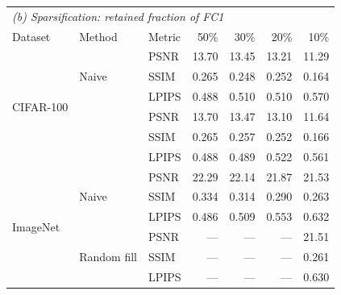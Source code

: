 \begin{table}[!t]
\par\smallskip

\begin{tabular*}{\columnwidth}{@{\extracolsep{\fill}}lllrrrr@{}}
\toprule
\multicolumn{7}{l}{\textit{(b) Sparsification: retained fraction of FC1}}\\
Dataset & Method & Metric & 50\% & 30\% & 20\% & 10\%\\
\midrule
\multirow{6}{*}{CIFAR-100} & \multirow{3}{*}{Naive} & PSNR & 13.70 & 13.45 & 13.21 & 11.29\\
 &  & SSIM & 0.265 & 0.248 & 0.252 & 0.164\\
 &  & LPIPS & 0.488 & 0.510 & 0.510 & 0.570\\
 & \multirow{3}{*}{\cora{}} & PSNR & 13.70 & 13.47 & 13.10 & 11.64\\
 &  & SSIM & 0.265 & 0.257 & 0.252 & 0.166\\
 &  & LPIPS & 0.488 & 0.489 & 0.522 & 0.561\\
\midrule
\multirow{6}{*}{ImageNet} & \multirow{3}{*}{Naive} & PSNR & 22.29 & 22.14 & 21.87 & 21.53\\
 &  & SSIM & 0.334 & 0.314 & 0.290 & 0.263\\
 &  & LPIPS & 0.486 & 0.509 & 0.553 & 0.632\\
 & \multirow{3}{*}{Random fill} & PSNR & --- & --- & --- & 21.51\\
 &  & SSIM & --- & --- & --- & 0.261\\
 &  & LPIPS & --- & --- & --- & 0.630\\
\bottomrule
\end{tabular*}
\end{table}
